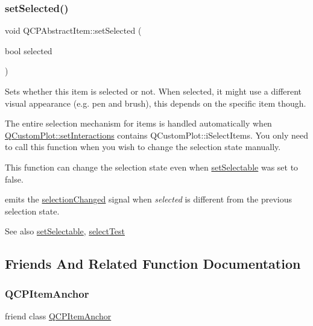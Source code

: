 \subsubsection{\texorpdfstring{set\+Selected()}{setSelected()}}
{\footnotesize\ttfamily void Q\+C\+P\+Abstract\+Item\+::set\+Selected (\begin{DoxyParamCaption}\item[{bool}]{selected }\end{DoxyParamCaption})}

Sets whether this item is selected or not. When selected, it might use a different visual appearance (e.\+g. pen and brush), this depends on the specific item though.

The entire selection mechanism for items is handled automatically when \hyperlink{class_q_custom_plot_a5ee1e2f6ae27419deca53e75907c27e5}{Q\+Custom\+Plot\+::set\+Interactions} contains Q\+Custom\+Plot\+::i\+Select\+Items. You only need to call this function when you wish to change the selection state manually.

This function can change the selection state even when \hyperlink{class_q_c_p_abstract_item_a8a8e32a55bc478b849756a78c2d87fd2}{set\+Selectable} was set to false.

emits the \hyperlink{class_q_c_p_abstract_item_aa5cffb034fc65dbb91c77e02c1c14251}{selection\+Changed} signal when {\itshape selected} is different from the previous selection state.

\begin{DoxySeeAlso}{See also}
\hyperlink{class_q_c_p_abstract_item_a8a8e32a55bc478b849756a78c2d87fd2}{set\+Selectable}, \hyperlink{class_q_c_p_abstract_item_ae41d0349d68bb802c49104afd100ba2a}{select\+Test} 
\end{DoxySeeAlso}


\subsection{Friends And Related Function Documentation}
\mbox{\label{class_q_c_p_abstract_item_a61767d414fd57af9eb1741b34268c7fc}} 
\subsubsection{\texorpdfstring{Q\+C\+P\+Item\+Anchor}{QCPItemAnchor}}
{\footnotesize\ttfamily friend class \hyperlink{class_q_c_p_item_anchor}{Q\+C\+P\+Item\+Anchor}\hspace{0.3cm}{\ttfamily [friend]}}

